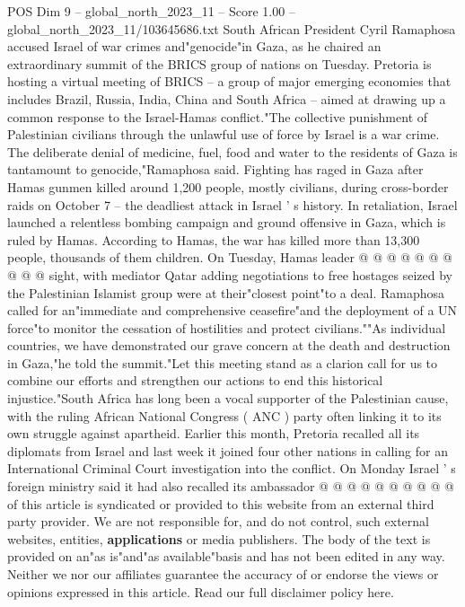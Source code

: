 \begin{textsample}{POS Dim 9 – global\_north\_2023\_11 – Score 1.00 – global\_north\_2023\_11/103645686.txt}  \label{ex:f9_pos_382}
South African President Cyril Ramaphosa accused Israel of war crimes and"genocide"in Gaza, as he chaired an extraordinary summit of the BRICS group of nations on Tuesday.
Pretoria is hosting a virtual meeting of BRICS -- a group of major emerging economies that includes Brazil, Russia, India, China and South Africa -- aimed at drawing up a common response to the Israel-Hamas conflict."The collective punishment of Palestinian civilians through the unlawful use of force by Israel is a war crime.
The deliberate denial of medicine, fuel, food and water to the residents of Gaza is tantamount to genocide,"Ramaphosa said.
Fighting has raged in Gaza after Hamas gunmen killed around 1,200 people, mostly civilians, during cross-border raids on October 7 -- the deadliest attack in Israel ' s history.
In retaliation, Israel launched a relentless bombing campaign and ground offensive in Gaza, which is ruled by Hamas.
According to Hamas, the war has killed more than 13,300 people, thousands of them children.
On Tuesday, Hamas leader @ @ @ @ @ @ @ @ @ @ sight, with mediator Qatar adding negotiations to free hostages seized by the Palestinian Islamist group were at their"closest point"to a deal.
Ramaphosa called for an"immediate and comprehensive ceasefire"and the deployment of a UN force"to monitor the cessation of hostilities and protect civilians.""As individual countries, we have demonstrated our grave concern at the death and destruction in Gaza,"he told the summit."Let this meeting stand as a clarion call for us to combine our efforts and strengthen our actions to end this historical injustice."South Africa has long been a vocal supporter of the Palestinian cause, with the ruling African National Congress ( ANC ) party often linking it to its own struggle against apartheid.
Earlier this month, Pretoria recalled all its diplomats from Israel and last week it joined four other nations in calling for an International Criminal Court investigation into the conflict.
On Monday Israel ' s foreign ministry said it had also recalled its ambassador @ @ @ @ @ @ @ @ @ @ of this article is syndicated or provided to this website from an external third party provider.
We are not responsible for, and do not control, such external websites, entities, \textbf{applications} or media publishers.
The body of the text is provided on an"as is"and"as available"basis and has not been edited in any way.
Neither we nor our affiliates guarantee the accuracy of or endorse the views or opinions expressed in this article.
Read our full disclaimer policy here.

\end{textsample}
